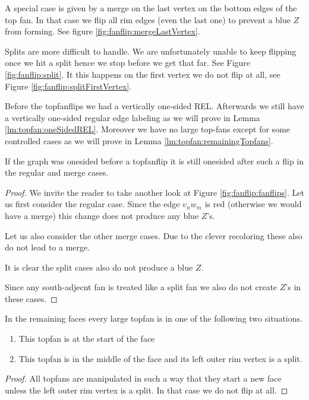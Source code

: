 A special case is given by a merge on the last vertex on the bottom edges of the top fan. In that case we flip all rim edges (even the last one) to prevent a blue $Z$ from forming. See figure \ref{fig:fanflip:mergeLastVertex}.

Splits are more difficult to handle. We are unfortunately unable to keep flipping once we hit a split hence we stop before we get that far. See Figure \ref{fig:fanflip:split}. It this happens on the first vertex we do not flip at all, see Figure \ref{fig:fanflip:splitFirstVertex}.

Before the topfanflips we had a vertically one-sided REL. Afterwards we still have a vertically one-sided regular edge labeling as we will prove in Lemma \ref{lm:topfan:oneSidedREL}. Moreover we have no large top-fans except for some controlled cases as we will prove in Lemma \ref{lm:topfan:remainingTopfans}.

\begin{lemma}
  \label{lm:topfan:oneSidedREL}
  If the graph was onesided before a topfanflip it is still onesided after such a flip in the regular and merge cases.
\end{lemma}
\begin{proof}
  We invite the reader to take another look at Figure \ref{fig:fanflip:fanflips}.
  Let us first consider the regular case. Since the edge  $v_n w_m$ is red (otherwise we would have a merge) this change does not produce any blue $Z$'s.

  Let us also consider the other merge cases. Due to the clever recoloring these also do not lead to a merge.

  It is clear the split cases also do not produce a blue $Z$.

  Since any south-adjecnt fan is treated like a split fan we also do not create $Z$'s  in these cases.
\end{proof}


\begin{lemma}
  \label{lm:topfan:remainingTopfans}
  In the remaining faces every large topfan is in one of the following two situations.
  \begin{enumerate}
    \item  This topfan is at the start of the face
    \item  This topfan is in the middle of the face and its left outer rim vertex is a split.
  \end{enumerate}
\end{lemma}
\begin{proof}
  All topfans are manipulated in such a way that they start a new face unless the left outer rim vertex is a split. In that case we do not flip at all.
\end{proof}
